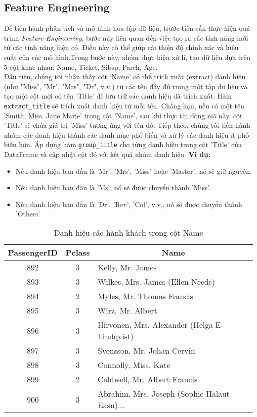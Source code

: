 \documentclass[11pt]{article}
\begin{document}
\subsection{Feature Engineering}
Để tiến hành phân tích và mô hình hóa tập dữ liệu, trước tiên cần thực hiện quá trình \textit{Feature Engineering}, bước này liên quan đến việc tạo ra các tính năng mới từ các tính năng hiện có. Điều này có thể giúp cải thiện độ chính xác và hiệu suất của các mô hình.Trong bước này, nhóm thực hiện xử lí, tạo dữ liệu dựa trên 5 cột khác nhau: Name, Ticket, Sibsp, Parch, Age.\\
Đầu tiên, chúng tôi nhận thấy cột ‘Name’ có thể trích xuất (extract) danh hiệu (như "Miss", "Mr", "Mrs", "Dr", v.v.) từ các tên đầy đủ trong một tập dữ liệu và tạo một cột mới có tên 'Title' để lưu trữ các danh hiệu đã trích xuất. Hàm \texttt{extract\_title} sẽ trích xuất danh hiệu từ mỗi tên. Chẳng hạn, nếu có một tên 'Smith, Miss. Jane Marie' trong cột 'Name', sau khi thực thi dòng mã này, cột 'Title' sẽ chứa giá trị 'Miss' tương ứng với tên đó. Tiếp theo, chúng tôi tiến hành nhóm các danh hiệu thành các danh mục phổ biến và xử lý các danh hiệu ít phổ biến hơn. Áp dụng hàm \texttt{group\_title} cho từng danh hiệu trong cột 'Title' của DataFrame và cập nhật cột đó với kết quả nhóm danh hiệu.
\textbf{Ví dụ:}
\begin{itemize}
    \item Nếu danh hiệu ban đầu là 'Mr', 'Mrs', 'Miss' hoặc 'Master', nó sẽ giữ nguyên.
    \item Nếu danh hiệu ban đầu là 'Ms', nó sẽ được chuyển thành 'Miss'.
    \item Nếu danh hiệu ban đầu là 'Dr', 'Rev', 'Col', v.v., nó sẽ được chuyển thành 'Others'.
\end{itemize}
\begin{table}[htbp]
\centering
\caption{Danh hiệu các hành khách trong cột Name}
\label{tab:passengers_small}
\begin{tabular}{|c|c|p{}|}
\hline
\multicolumn{1}{|c|}{\textbf{PassengerID}} & \multicolumn{1}{c|}{\textbf{Pclass}} & \multicolumn{1}{c|}{\textbf{Name}} \\ \hline
892 & 3 & Kelly, Mr. James \\ \hline
893 & 3 & Wilkes, Mrs. James (Ellen Needs) \\ \hline
894 & 2 & Myles, Mr. Thomas Francis \\ \hline
895 & 3 & Wirz, Mr. Albert \\ \hline
896 & 3 & Hirvonen, Mrs. Alexander (Helga E Lindqvist) \\ \hline
897 & 3 & Svensson, Mr. Johan Cervin \\ \hline
898 & 3 & Connolly, Miss. Kate \\ \hline
899 & 2 & Caldwell, Mr. Albert Francis \\ \hline
900 & 3 & Abrahim, Mrs. Joseph (Sophie Halaut Easu)... \\ \hline
\end{tabular}
\end{table}
\end{document}
